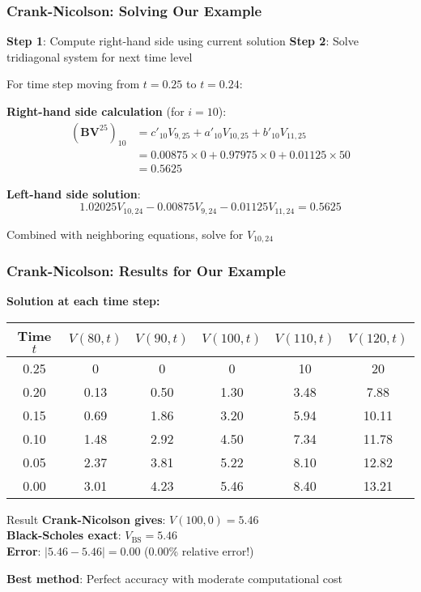 \documentclass[aspectratio=169]{beamer}
\begin{document}
\begin{frame}
\frametitle{Crank-Nicolson: Solving Our Example}
\textbf{Step 1}: Compute right-hand side using current solution
\textbf{Step 2}: Solve tridiagonal system for next time level

For time step moving from \(t = 0.25\) to \(t = 0.24\):

\textbf{Right-hand side calculation} (for \(i = 10\)):
\begin{align}
(\mathbf{B}\mathbf{V}^{25})_{10} &= c'_{10} V_{9,25} + a'_{10} V_{10,25} + b'_{10} V_{11,25} \\
&= 0.00875 \times 0 + 0.97975 \times 0 + 0.01125 \times 50 \\
&= 0.5625
\end{align}

\textbf{Left-hand side solution}:
\[1.02025 V_{10,24} - 0.00875 V_{9,24} - 0.01125 V_{11,24} = 0.5625\]

Combined with neighboring equations, solve for \(V_{10,24}\)
\end{frame}

\begin{frame}
\frametitle{Crank-Nicolson: Results for Our Example}
\textbf{Solution at each time step:}

\begin{center}
\begin{tabular}{c|c|c|c|c|c}
Time \(t\) & \(V(80,t)\) & \(V(90,t)\) & \(V(100,t)\) & \(V(110,t)\) & \(V(120,t)\) \\
\hline
0.25 & 0 & 0 & 0 & 10 & 20 \\
0.20 & 0.13 & 0.50 & 1.30 & 3.48 & 7.88 \\
0.15 & 0.69 & 1.86 & 3.20 & 5.94 & 10.11 \\
0.10 & 1.48 & 2.92 & 4.50 & 7.34 & 11.78 \\
0.05 & 2.37 & 3.81 & 5.22 & 8.10 & 12.82 \\
0.00 & 3.01 & 4.23 & 5.46 & 8.40 & 13.21 \\
\end{tabular}
\end{center}

\begin{block}{Result}
\textbf{Crank-Nicolson gives}: \(V(100, 0) = 5.46\)\\
\textbf{Black-Scholes exact}: \(V_{\text{BS}} = 5.46\)\\
\textbf{Error}: \(|5.46 - 5.46| = 0.00\) (0.00\% relative error!)
\end{block}

\textbf{Best method}: Perfect accuracy with moderate computational cost
\end{frame}
\end{document}
